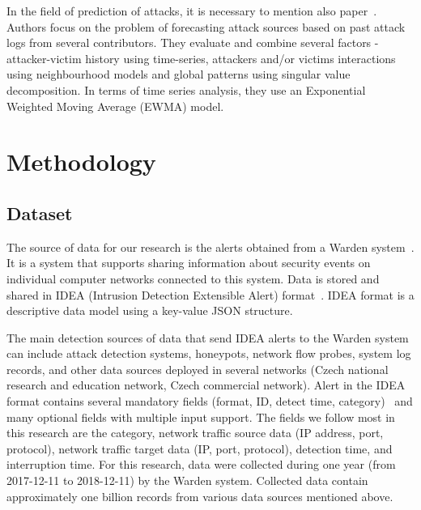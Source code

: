 \documentclass[runningheads]{llncs}
\begin{document}
In the field of prediction of attacks, it is necessary to mention also paper~\cite{soldo2011blacklisting}. Authors focus on the problem of forecasting attack sources based on past attack logs from several contributors. They evaluate and combine several factors - attacker-victim history using time-series, attackers and/or victims interactions using neighbourhood models and global patterns using singular value decomposition. In terms of time series analysis, they use an Exponential Weighted Moving Average (EWMA) model.

\section{Methodology}

\subsection{Dataset}
The source of data for our research is the alerts obtained from a Warden system~\cite{kacha2015warden}. It is a system that supports sharing information about security events on individual computer networks connected to this system. Data is stored and shared in IDEA (Intrusion Detection Extensible Alert) format~\cite{kacha2014idea}. IDEA format is a descriptive data model using a key-value JSON structure.

The main detection sources of data that send IDEA alerts to the Warden system can include attack detection systems, honeypots, network flow probes, system log records, and other data sources deployed in several networks (Czech national research and education network, Czech commercial network). Alert in the IDEA format contains several mandatory fields (format, ID, detect time, category)~\cite{kacha2014idea} and many optional fields with multiple input support. The fields we follow most in this research are the category, network traffic source data (IP address, port, protocol), network traffic target data (IP, port, protocol), detection time, and interruption time. For this research, data were collected during one year (from 2017-12-11 to 2018-12-11) by the Warden system. Collected data contain approximately one billion records from various data sources mentioned above. 
\end{document}
